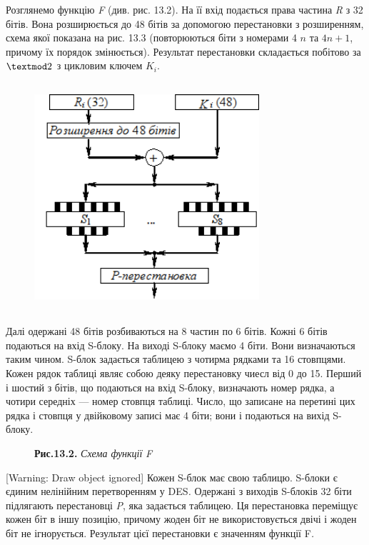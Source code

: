  Розглянемо функцію \textit{F} (див. рис. 13.2). На її вхід подається права
частина \textit{R}  з 32 бітів. Вона розширюється до 48 бітів за допомогою
перестановки з розширенням, схема якої показана на рис. 13.3 (повторюються біти
з номерами 4 $n$ та  $4n+1$, причому їх порядок змінюється). Результат
перестановки складається побітово за  $\textmod2$ з цикловим ключем 
$K_i$. 

\begin{figure}
\centering
\includegraphics[width=3.2772in,height=3.3307in]{crypt-img/crypt-img296.png}
\end{figure}
Далі одержані 48 бітів розбиваються на 8 частин по 6 бітів. Кожні 6 бітів
подаються на вхід S-блоку. На виході S-блоку маємо 4 біти. Вони визначаються
таким чином. S-блок задається таблицею з чотирма рядками та 16 стовпцями. Кожен
рядок таблиці являє собою деяку перестановку чиесл від 0 до 15. Перший і шостий
з бітів, що подаються на вхід S-блоку, визначають номер рядка, а чотири
середніх --- номер стовпця таблиці. Число, що записане на перетині цих рядка і
стовпця у двійковому записі має 4 біти; вони і подаються на вихід  S-блоку.

\begin{figure}
\centering
\begin{minipage}{2.1043in}
\textbf{Рис.13.2.}\textit{ Схема функції }\textit{F}
\end{minipage}
\end{figure}
[Warning: Draw object ignored] Кожен S-блок має свою таблицю.  S-блоки є єдиним
нелінійним перетворенням у DES\textit{.} Одержані з виходів S-блоків 32 біти
підлягають перестановці \textit{P}, яка задається таблицею. Ця перестановка
переміщує кожен біт в іншу позицію, причому жоден біт не використовується двічі
і жоден біт не ігнорується. Результат цієї перестановки є значенням функції
F\textit{.}

